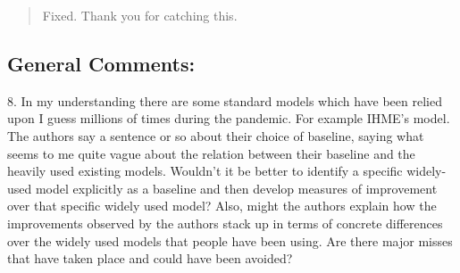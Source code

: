 \documentclass[11pt]{article}
\newenvironment{resp}{\begin{quote}\color{cobalt}}{\end{quote}}
\begin{document}
\begin{resp}
  Fixed. Thank you for catching this.
\end{resp}

\subsection*{General Comments: }

8. In my understanding there are some standard models which have been relied
upon I guess millions of times during the pandemic. For example IHME's model.
The authors say a sentence or so about their choice of baseline, saying what
seems to me quite vague about the relation between their baseline and the
heavily used existing models. Wouldn't it be better to identify a specific
widely-used model explicitly as a baseline and then develop measures of
improvement over that specific widely used model? Also, might the authors
explain how the improvements observed by the authors stack up in terms of
concrete differences over the widely used models that people have been using.
Are there major misses that have taken place and could have been avoided?  
\end{document}
